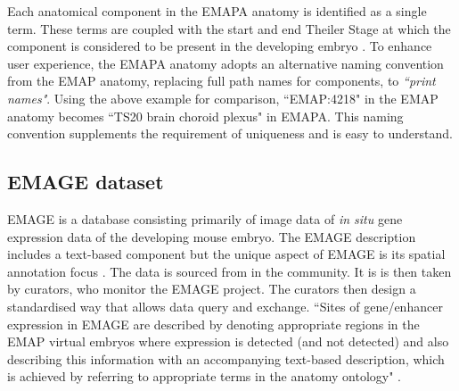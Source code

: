 Each anatomical component in the EMAPA anatomy is identified as a single term. These terms are coupled with the start and end Theiler Stage at which the component is considered to be present in the developing embryo \cite{emap}. To enhance user experience, the EMAPA anatomy  adopts an alternative naming convention from the EMAP anatomy, replacing full path names for components, to \textit{``print names"}. Using the above example for comparison, ``EMAP:4218" in the EMAP anatomy becomes ``TS20 brain choroid plexus" in EMAPA. This naming convention supplements the requirement of uniqueness and is easy to understand.

\subsection{EMAGE dataset}
EMAGE is a database consisting primarily of image data of \textit{in situ} gene expression data of the developing mouse embryo. The EMAGE description includes a text-based component but the unique aspect of EMAGE is its spatial annotation focus \cite{emap}. The data is sourced from in the community. It is is then taken by curators, who monitor the EMAGE project. The curators then design a standardised way that allows data query and exchange. ``Sites of gene/enhancer expression in EMAGE are described by denoting appropriate regions in the EMAP virtual embryos where expression is detected (and not detected) and also describing this information with an accompanying text-based description, which is achieved by referring to appropriate terms in the anatomy ontology" \cite{emap}.